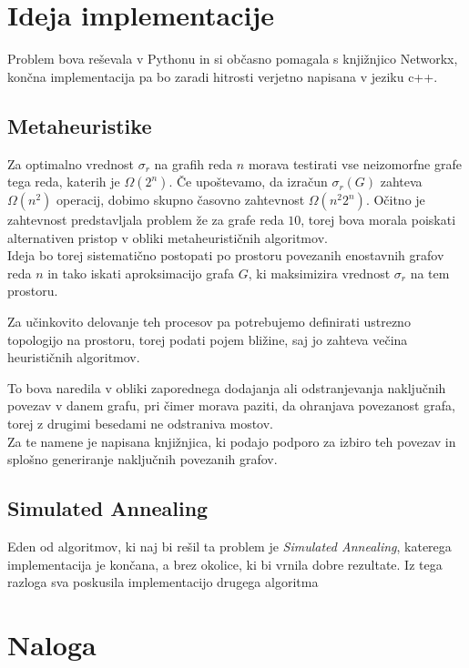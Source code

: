 \documentclass[ letterpaper, titlepage, fleqn]{article}
\begin{document}
\section{Ideja implementacije}
Problem bova reševala v Pythonu in si občasno pomagala s knjižnjico Networkx,
končna implementacija pa bo zaradi hitrosti verjetno napisana v jeziku c++.

\subsection{Metaheuristike}
Za optimalno vrednost $\sigma_r$ na grafih reda $n$ morava testirati vse neizomorfne
grafe tega reda, katerih je $\Omega(2^n)$. Če upoštevamo, da izračun $\sigma_r(G)$ 
zahteva $\Omega(n^2)$ operacij, dobimo skupno časovno zahtevnost $\Omega(n^2 2^n)$.
Očitno je zahtevnost predstavljala problem že za grafe reda $10$, 
torej bova morala poiskati alternativen pristop v obliki metaheurističnih algoritmov. \\

Ideja bo torej sistematično postopati po prostoru povezanih enostavnih grafov reda $n$ in 
tako iskati aproksimacijo grafa $G$, ki maksimizira vrednost $\sigma_r$ na tem prostoru.

Za učinkovito delovanje teh procesov pa potrebujemo definirati ustrezno topologijo 
na prostoru, torej podati pojem bližine, saj jo zahteva večina heurističnih algoritmov.

To bova naredila v obliki zaporednega dodajanja ali odstranjevanja naključnih povezav v 
danem grafu, pri čimer morava paziti, da ohranjava povezanost grafa, 
torej z drugimi besedami ne odstraniva mostov.\\
Za te namene je napisana knjižnjica, ki podajo podporo za izbiro teh povezav
in splošno generiranje naključnih povezanih grafov.

\subsection{Simulated Annealing}
Eden od algoritmov, ki naj bi rešil ta problem je {\em Simulated Annealing}, 
katerega implementacija je končana, a brez okolice, ki bi vrnila dobre rezultate.
Iz tega razloga sva poskusila implementacijo drugega algoritma

\section{Naloga}
\end{document}
